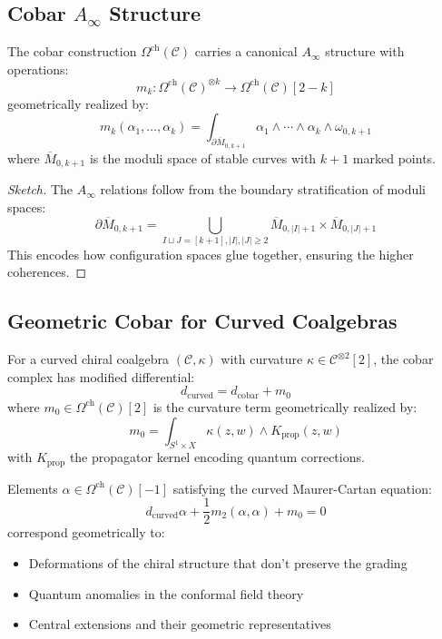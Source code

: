 \subsection{Cobar $A_\infty$ Structure}

\begin{theorem}\label{thm:cobar-ainfty}
The cobar construction $\Omega^{\text{ch}}(\mathcal{C})$ carries a canonical $A_\infty$ structure with operations:
\[
m_k: \Omega^{\text{ch}}(\mathcal{C})^{\otimes k} \to \Omega^{\text{ch}}(\mathcal{C})[2-k]
\]
geometrically realized by:
\[
m_k(\alpha_1, \ldots, \alpha_k) = \int_{\partial \overline{M}_{0,k+1}} \alpha_1 \wedge \cdots \wedge \alpha_k \wedge \omega_{0,k+1}
\]
where $\overline{M}_{0,k+1}$ is the moduli space of stable curves with $k+1$ marked points.
\end{theorem}

\begin{proof}[Sketch]
The $A_\infty$ relations follow from the boundary stratification of moduli spaces:
\[
\partial \overline{M}_{0,k+1} = \bigcup_{I \sqcup J = [k+1], |I|,|J| \geq 2} \overline{M}_{0,|I|+1} \times \overline{M}_{0,|J|+1}
\]
This encodes how configuration spaces glue together, ensuring the higher coherences.
\end{proof}

\subsection{Geometric Cobar for Curved Coalgebras}

\begin{definition}\label{def:curved-cobar}
For a curved chiral coalgebra $(\mathcal{C}, \kappa)$ with curvature $\kappa \in \mathcal{C}^{\otimes 2}[2]$, the cobar complex has modified differential:
\[
d_{\text{curved}} = d_{\text{cobar}} + m_0
\]
where $m_0 \in \Omega^{\text{ch}}(\mathcal{C})[2]$ is the curvature term geometrically realized by:
\[
m_0 = \int_{S^1 \times X} \kappa(z, w) \wedge K_{\text{prop}}(z, w) 
\]
with $K_{\text{prop}}$ the propagator kernel encoding quantum corrections.
\end{definition}

\begin{theorem}\label{thm:curved-mc-cobar}
Elements $\alpha \in \Omega^{\text{ch}}(\mathcal{C})[-1]$ satisfying the curved Maurer-Cartan equation:
\[
d_{\text{curved}}\alpha + \frac{1}{2}m_2(\alpha, \alpha) + m_0 = 0
\]
correspond geometrically to:
\begin{itemize}
\item Deformations of the chiral structure that don't preserve the grading
\item Quantum anomalies in the conformal field theory
\item Central extensions and their geometric representatives
\end{itemize}
\end{theorem}

